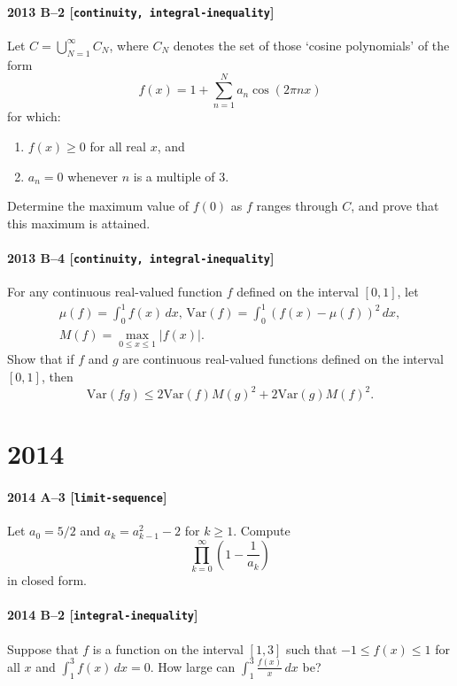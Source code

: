 \documentclass[11pt]{article}
\begin{document}
\paragraph{2013 B--2 \textnormal{[\texttt{continuity, integral-inequality}]}}
Let $C = \bigcup_{N=1}^\infty C_N$, where $C_N$ denotes the set of those `cosine polynomials' of the form
\[
f(x) = 1 + \sum_{n=1}^N a_n \cos(2 \pi n x)
\]
for which:
\begin{enumerate}
\item[(i)]
$f(x) \geq 0$ for all real $x$, and
\item[(ii)]
$a_n = 0$ whenever $n$ is a multiple of $3$.
\end{enumerate}
Determine the maximum value of $f(0)$ as $f$ ranges through $C$, and
prove that this maximum is attained.

\paragraph{2013 B--4 \textnormal{[\texttt{continuity, integral-inequality}]}}
For any continuous real-valued function $f$ defined on the interval $[0,1]$, let
\begin{gather*}
\mu(f) = \int_0^1 f(x)\,dx, \,
\mathrm{Var}(f) = \int_0^1 (f(x) - \mu(f))^2\,dx, \\
M(f) = \max_{0 \leq x \leq 1} \left| f(x) \right|.
\end{gather*}
Show that if $f$ and $g$ are continuous real-valued functions
defined on the interval $[0,1]$,
then
\[
\mathrm{Var}(fg) \leq 2 \mathrm{Var}(f) M(g)^2 + 2 \mathrm{Var}(g) M(f)^2.
\]

\section*{2014}

\paragraph{2014 A--3 \textnormal{[\texttt{limit-sequence}]}}
Let $a_0 = 5/2$ and $a_k = a_{k-1}^2 - 2$ for $k \geq 1$. Compute
\[
\prod_{k=0}^\infty \left(1 - \frac{1}{a_k} \right)
\]
in closed form.

\paragraph{2014 B--2 \textnormal{[\texttt{integral-inequality}]}}
Suppose that $f$ is a function on the interval $[1,3]$ such that $-1 \leq f(x) \leq 1$ for all $x$ and $\int_1^3 f(x)\,dx = 0$. How large can $\int_1^3 \frac{f(x)}{x}\,dx$ be?
\end{document}
